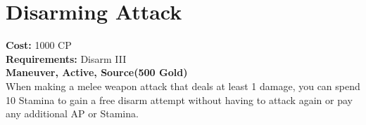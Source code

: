 \section{Disarming Attack}\label{maneuver:disarmingAttack}
\textbf{Cost:} 1000 CP\\
\textbf{Requirements:} Disarm III\\
\textbf{Maneuver, Active, Source(500 Gold)}\\
When making a melee weapon attack that deals at least 1 damage, you can spend 10 Stamina to gain a free disarm attempt without having to attack again or pay any additional AP or Stamina.\\
